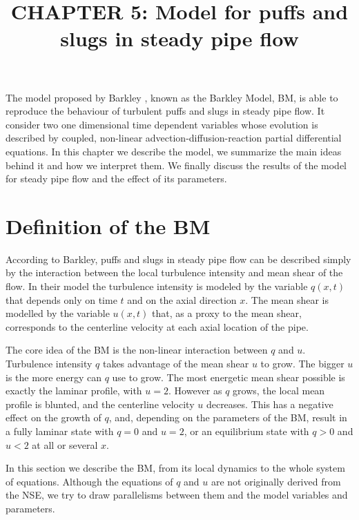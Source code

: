 \documentclass{article}
\title{CHAPTER 5: Model for puffs and slugs in steady pipe flow}
\date{}
\begin{document}
\maketitle
The model proposed by Barkley \cite{barkley2011modeling}, known as the Barkley Model, BM, is able to reproduce the behaviour of turbulent puffs and slugs in steady pipe flow. It consider two one dimensional time dependent variables whose evolution is described by coupled, non-linear advection-diffusion-reaction partial differential equations. In this chapter we describe the model, we summarize the main ideas behind it and how we interpret them. We finally discuss the results of the model for steady pipe flow and the effect of its parameters. 



\section{Definition of the BM}
According to Barkley, puffs and slugs in steady pipe flow can be described simply by the interaction between the local turbulence intensity and mean shear of the flow. In their model the turbulence intensity is modeled by the variable $q \left(x,t\right)$ that depends only on time $t$ and on the axial direction $x$. The mean shear is modelled by the variable $u\left(x,t \right)$ that, as a proxy to the mean shear, corresponds to the centerline velocity at each axial location of the pipe. 

The core idea of the BM is the non-linear interaction between $q$ and $u$. Turbulence intensity $q$ takes advantage of the mean shear $u$ to grow. The bigger $u$ is the more energy can $q$ use to grow. The most energetic mean shear possible is exactly the laminar profile, with $u=2$. However as $q$ grows, the local mean profile is blunted, and the centerline velocity $u$ decreases. This has a negative effect on the growth of $q$, and, depending on the  parameters of the BM, result in a fully laminar state with $q=0$ and $u=2$, or an equilibrium state with $q>0$ and $u<2$ at all or several $x$.

In this section we describe the BM, from its local dynamics to the whole system of equations. Although the equations of $q$ and $u$ are not originally derived from the NSE, we try to draw parallelisms between them and the model variables and parameters.
\end{document}
